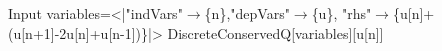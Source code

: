 \begin{mmaCell}[moredefined={variables, expression, DiscreteConservedQ}]{Input}
  variables=<|"indVars"\(\pmb{\to}\)\{n\},"depVars"\(\pmb{\to}\)\{u\},
  "rhs"\(\pmb{\to}\)\{u[n]+(u[n+1]-2u[n]+u[n-1])\}|>
  DiscreteConservedQ[variables][u[n]]
  
\end{mmaCell}